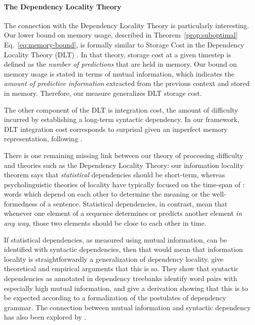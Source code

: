 \paragraph{The Dependency Locality Theory}
The connection with the Dependency Locality Theory is particularly interesting.
Our lower bound on memory usage, described in Theorem~\ref{prop:suboptimal} Eq.~\ref{eq:memory-bound}, is formally similar to Storage Cost in the Dependency Locality Theory (DLT) \citep{gibson-linguistic-1998,gibson2000dependency}.
In that theory, storage cost at a given timestep is defined as the \emph{number of predictions} that are held in memory.
Our bound on memory usage is stated in terms of mutual information, which indicates the \emph{amount of predictive information} extracted from the previous context and stored in memory.
Therefore, our measure generalizes DLT storage cost.


The other component of the DLT is integration cost, the amount of difficulty incurred by establishing a long-term syntactic dependency. 
In our framework, DLT integration cost corresponds to surprisal given an imperfect memory representation, following \cite{futrell2020lossy}.

There is one remaining missing link between our theory of processing difficulty and theories such as the Dependency Locality Theory:
our information locality theorem says that \emph{statistical} dependencies should be short-term, whereas psycholinguistic theories of locality have typically focused on the time-span of : words which depend on each other to determine the meaning or the well-formedness of a sentence. Statistical dependencies, in contrast, mean that whenever one element of a sequence determines or predicts another element \emph{in any way}, those two elements should be close to each other in time. 

If statistical dependencies, as measured using mutual information, can be identified with syntactic dependencies, then that would mean that information locality is straightforwardly a generalization of dependency locality. \citet{futrell2019syntactic} give theoretical and empirical arguments that this is so. They show that syntactic dependencies as annotated in dependency treebanks identify word pairs with especially high mutual information, and give a derivation showing that this is to be expected according to a formalization of the postulates of dependency grammar. The connection between mutual information and syntactic dependency has also been explored by \citet{}. %



